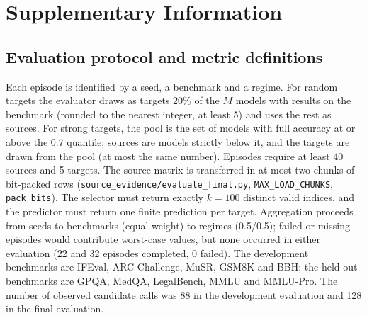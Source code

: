 \documentclass{article}
\begin{document}
\clearpage



\clearpage
\appendix
\section{Supplementary Information}

\subsection{Evaluation protocol and metric definitions}
Each episode is identified by a seed, a benchmark and a regime. For random targets the evaluator draws as targets 20\% of the $M$ models with results on the benchmark (rounded to the nearest integer, at least 5) and uses the rest as sources. For strong targets, the pool is the set of models with full accuracy at or above the 0.7 quantile; sources are models strictly below it, and the targets are drawn from the pool (at most the same number). Episodes require at least 40 sources and 5 targets. The source matrix is transferred in at most two chunks of bit-packed rows (\texttt{source\_evidence/evaluate\_final.py}, \texttt{MAX\_LOAD\_CHUNKS}, \texttt{pack\_bits}). The selector must return exactly $k{=}100$ distinct valid indices, and the predictor must return one finite prediction per target. Aggregation proceeds from seeds to benchmarks (equal weight) to regimes (0.5/0.5); failed or missing episodes would contribute worst-case values, but none occurred in either evaluation (22 and 32 episodes completed, 0 failed). The development benchmarks are IFEval, ARC-Challenge, MuSR, GSM8K and BBH; the held-out benchmarks are GPQA, MedQA, LegalBench, MMLU and MMLU-Pro. The number of observed candidate calls was 88 in the development evaluation and 128 in the final evaluation.
\end{document}
